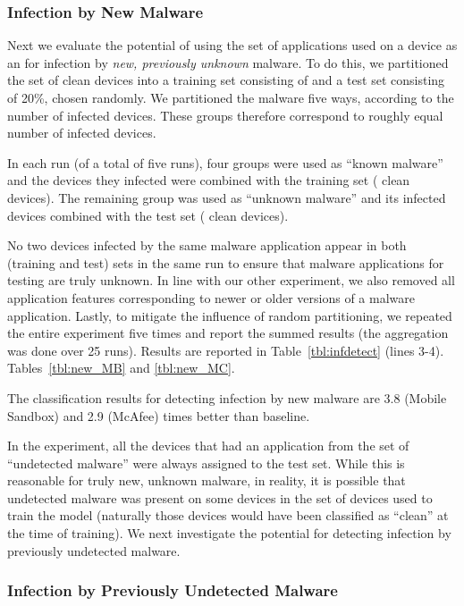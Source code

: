 \subsubsection{Infection by New Malware}
\label{subsubsec:predictions:applications:new}

Next we evaluate the potential of using the set of applications used
on a device as an {\predictor}  for infection by \textit{new, previously
  unknown} malware.  To do this, we partitioned the set of clean devices
into a training set consisting of  and a test set consisting of
20\%, chosen randomly. We partitioned the malware five ways, according to the number of infected devices.
These
groups therefore correspond to roughly equal number of infected
devices. 

In each run (of a total of five runs), four groups were used as ``known
malware'' and the devices they infected were combined with the
training set ( clean devices).  The remaining group was used as
``unknown malware'' and its infected devices combined with the test
set ( clean devices).


No two devices infected by the same malware application appear in both
(training and test) sets in the same run to ensure that malware
applications for testing are truly unknown. In line with our other
experiment, we also removed all application features corresponding to
newer or older versions of a malware application. Lastly, to mitigate
the influence of random partitioning, we repeated the entire experiment
five times and report the summed results (the aggregation was done
over 25 runs). Results are reported in 
\ifwww
Table~\ref{tbl:infdetect} (lines 3-4).
\else
Tables~\ref{tbl:new_MB} and
\ref{tbl:new_MC}.
\fi

The classification results for detecting infection
by new malware are 3.8 (Mobile Sandbox) and 2.9 (McAfee) times better
than baseline.

In the experiment, all the devices that had an application from the
set of ``undetected malware'' were always assigned to the test set.
While this is reasonable for truly new, unknown malware, in reality,
it is possible that undetected malware was present on some devices in
the set of devices used to train the model (naturally those devices
would have been classified as ``clean'' at the time of training). We
next investigate the potential for detecting infection by previously
undetected malware.


\subsubsection{Infection by Previously Undetected Malware}
\label{subsubsec:predictions:applications:undetected}

